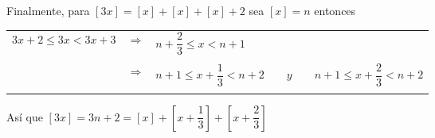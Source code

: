 \begin{enumerate}
\begin{enumerate}[\bfseries (a)]
		Finalmente, para $[3x]=[x]+[x]+[x]+2$ sea $[x]=n$ entonces
		\begin{center}
		    \begin{tabular}{rcl}
			$3x+2\leq 3x < 3x+3$&$\Longrightarrow$&$n+\dfrac{2}{3} \leq x < n+1$\\\\
			&$\Longrightarrow$&$n+1 \leq x +\dfrac{1}{3}<n+2 \qquad y \qquad n+1\leq x+\dfrac{2}{3}<n+2$\\\\
		    \end{tabular}
		\end{center}
		Así que $[3x]=3n+2=[x]+\left[x+\dfrac{1}{3}\right]+\left[x+\dfrac{2}{3}\right]$\\\\

	\end{enumerate}


\end{enumerate}
